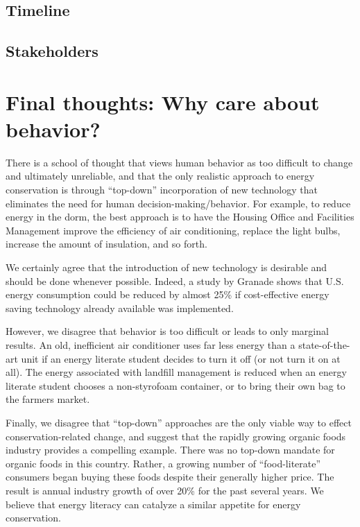 \documentclass[11pt]{article}
\begin{document}
\subsection{Timeline}

\subsection{Stakeholders}


\section{Final thoughts: Why care about behavior?}

There is a school of thought that views human behavior as too difficult to
change and ultimately unreliable, and that the only realistic approach to
energy conservation is through ``top-down'' incorporation of new technology
that eliminates the need for human decision-making/behavior.  For example,
to reduce energy in the dorm, the best approach is to have the Housing
Office and Facilities Management improve the efficiency of air
conditioning, replace the light bulbs, increase the amount of insulation,
and so forth.

We certainly agree that the introduction of new technology is desirable and
should be done whenever possible.  Indeed, a study by Granade \cite{Granade09}
shows that U.S. energy consumption could be reduced by almost 25\% if
cost-effective energy saving technology already available was implemented.

However, we disagree that behavior is too difficult or leads to only
marginal results.  An old, inefficient air conditioner uses far less energy
than a state-of-the-art unit if an energy literate student decides to turn
it off (or not turn it on at all).  The energy associated with landfill
management is reduced when an energy literate student chooses a
non-styrofoam container, or to bring their own bag to the farmers market.

Finally, we disagree that ``top-down'' approaches are the only viable way
to effect conservation-related change, and suggest that the rapidly growing
organic foods industry provides a compelling example.  There was no
top-down mandate for organic foods in this country. Rather, a growing
number of ``food-literate'' consumers began buying these foods despite
their generally higher price.  The result is annual industry growth of over
20\% for the past several years.  We believe that energy literacy can
catalyze a similar appetite for energy conservation.









\end{document}
